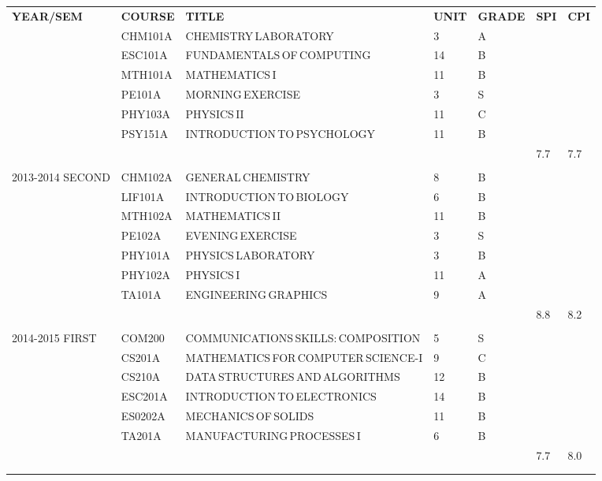 \documentclass{article}
\newcommand{\transcriptentry}[6]{
		\tiny{#1} & \tiny{#2} & \tiny{#3} & \tiny{#4} & \tiny{#5} & \tiny{#6} \\ 
		}
\begin{document}
\begin{center}
	\begin{tabular}{m{5em}  m{1.5cm} m{5cm} m{0.5cm} m{0.7cm} m{0.3cm} m{0.5cm}} 
	\hdashline
	\tiny{\textbf{YEAR/SEM}} & \transcriptentry{\textbf{COURSE}}{\textbf{TITLE}}{\textbf{UNIT}}{\textbf{GRADE}}{\textbf{SPI}}{\textbf{CPI}}
	\hdashline
	\multirow{7}{5em}{\tiny{2013-2014 FIRST}}
		& \transcriptentry{CHM101A}{CHEMISTRY\,LABORATORY}{3}{A}{}{}
		& \transcriptentry{ESC101A}{FUNDAMENTALS\,OF\,COMPUTING}{14}{B}{}{}
		& \transcriptentry{MTH101A}{MATHEMATICS\,I}{11}{B}{}{}
		& \transcriptentry{PE101A}{MORNING\,EXERCISE}{3}{S}{}{}
		& \transcriptentry{PHY103A}{PHYSICS\,II}{11}{C}{}{}
		& \transcriptentry{PSY151A}{INTRODUCTION\,TO\,PSYCHOLOGY}{11}{B}{}{}
		& \transcriptentry{}{}{}{}{\small {7.7}}{\small{7.7}}
		\\
	\multirow{7}{5em}{\tiny{2013-2014 SECOND}}
		& \transcriptentry{CHM102A}{GENERAL\,CHEMISTRY}{8}{B}{}{}
		& \transcriptentry{LIF101A}{INTRODUCTION\,TO\,BIOLOGY}{6}{B}{}{}
		& \transcriptentry{MTH102A}{MATHEMATICS\,II}{11}{B}{}{}
		& \transcriptentry{PE102A}{EVENING\,EXERCISE}{3}{S}{}{}
		& \transcriptentry{PHY101A}{PHYSICS\,LABORATORY}{3}{B}{}{}
		& \transcriptentry{PHY102A}{PHYSICS\,I}{11}{A}{}{}
		& \transcriptentry{TA101A}{ENGINEERING\,GRAPHICS}{9}{A}{}{}
		& \transcriptentry{}{}{}{}{\small{8.8}}{\small{8.2}}
		\\	
	\multirow{7}{5em}{\tiny{2014-2015 FIRST}}
		& \transcriptentry{COM200}{COMMUNICATIONS\,SKILLS:\,COMPOSITION}{5}{S}{}{}
		& \transcriptentry{CS201A}{MATHEMATICS\,FOR\,COMPUTER\,SCIENCE-I}{9}{C}{}{}
		& \transcriptentry{CS210A}{DATA\,STRUCTURES\,AND\,ALGORITHMS}{12}{B}{}{}
		& \transcriptentry{ESC201A}{INTRODUCTION\,TO\,ELECTRONICS}{14}{B}{}{}
		& \transcriptentry{ES0202A}{MECHANICS\,OF\,SOLIDS}{11}{B}{}{}
		& \transcriptentry{TA201A}{MANUFACTURING\,PROCESSES\,I}{6}{B}{}{}
		& \transcriptentry{}{}{}{}{\small{7.7}}{\small{8.0}}\\
	\hdashline
	\end{tabular}
\end{center}
\end{document}

